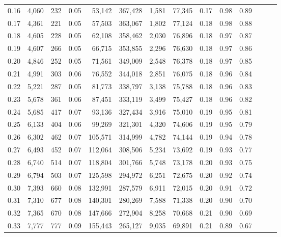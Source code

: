 \begin{tabular}{rrrrrrrrrrrrrr}
0.16 &   4,060 &    232 &  0.05 &   53,142 &  367,428 &   1,581 &  77,345 &  0.17 &  0.98 &      0.89 \\
0.17 &   4,361 &    221 &  0.05 &   57,503 &  363,067 &   1,802 &  77,124 &  0.18 &  0.98 &      0.88 \\
0.18 &   4,605 &    228 &  0.05 &   62,108 &  358,462 &   2,030 &  76,896 &  0.18 &  0.97 &      0.87 \\
0.19 &   4,607 &    266 &  0.05 &   66,715 &  353,855 &   2,296 &  76,630 &  0.18 &  0.97 &      0.86 \\
0.20 &   4,846 &    252 &  0.05 &   71,561 &  349,009 &   2,548 &  76,378 &  0.18 &  0.97 &      0.85 \\
0.21 &   4,991 &    303 &  0.06 &   76,552 &  344,018 &   2,851 &  76,075 &  0.18 &  0.96 &      0.84 \\
0.22 &   5,221 &    287 &  0.05 &   81,773 &  338,797 &   3,138 &  75,788 &  0.18 &  0.96 &      0.83 \\
0.23 &   5,678 &    361 &  0.06 &   87,451 &  333,119 &   3,499 &  75,427 &  0.18 &  0.96 &      0.82 \\
0.24 &   5,685 &    417 &  0.07 &   93,136 &  327,434 &   3,916 &  75,010 &  0.19 &  0.95 &      0.81 \\
0.25 &   6,133 &    404 &  0.06 &   99,269 &  321,301 &   4,320 &  74,606 &  0.19 &  0.95 &      0.79 \\
0.26 &   6,302 &    462 &  0.07 &  105,571 &  314,999 &   4,782 &  74,144 &  0.19 &  0.94 &      0.78 \\
0.27 &   6,493 &    452 &  0.07 &  112,064 &  308,506 &   5,234 &  73,692 &  0.19 &  0.93 &      0.77 \\
0.28 &   6,740 &    514 &  0.07 &  118,804 &  301,766 &   5,748 &  73,178 &  0.20 &  0.93 &      0.75 \\
0.29 &   6,794 &    503 &  0.07 &  125,598 &  294,972 &   6,251 &  72,675 &  0.20 &  0.92 &      0.74 \\
0.30 &   7,393 &    660 &  0.08 &  132,991 &  287,579 &   6,911 &  72,015 &  0.20 &  0.91 &      0.72 \\
0.31 &   7,310 &    677 &  0.08 &  140,301 &  280,269 &   7,588 &  71,338 &  0.20 &  0.90 &      0.70 \\
0.32 &   7,365 &    670 &  0.08 &  147,666 &  272,904 &   8,258 &  70,668 &  0.21 &  0.90 &      0.69 \\
0.33 &   7,777 &    777 &  0.09 &  155,443 &  265,127 &   9,035 &  69,891 &  0.21 &  0.89 &      0.67 \\

\end{tabular}
